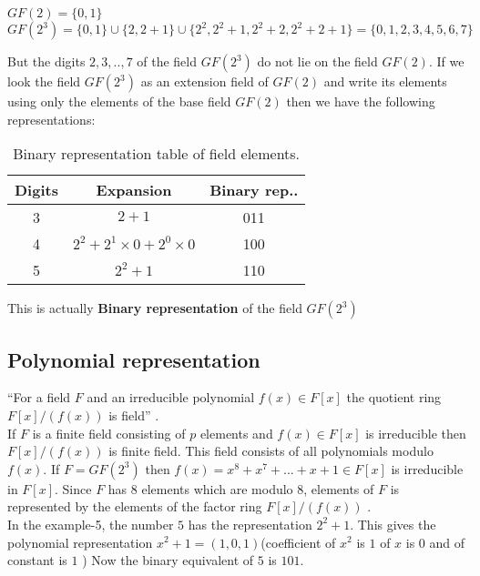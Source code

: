 \begin{example}
    \(GF(2)=\{0,1\}\)\\
    \(GF(2^3)=\{0,1\} \cup \{2,2+1\} \cup \{2^2,2^2+1,2^2+2,2^2+2+1\}=\{0,1,2,3,4,5,6,7\}\)
\end{example}

But the digits \(2,3,..,7\) of the field \(GF(2^3)\) do not lie on the field \(GF(2)\). If we look the field \(GF(2^3)\) as an extension field of \(GF(2)\) and write its elements using only the elements of the base field \(GF(2)\) then we have the following representations:
\vspace{3mm}

\begin{table}[h!]
  \centering
\begin{tabular}{|c|c|c|}
    \hline
    Digits & Expansion & Binary rep..\\
    \hline
    3 & \(2+1\) & 011 \\
    4 & \(2^2+2^1 \times 0 +2^0 \times 0\) & 100 \\
    5 & \(2^2+1\) & 110 \\
    \hline
\end{tabular}
\caption{\small Binary representation table of field elements.}
\end{table}
\vspace{3mm}

This is actually \textbf{Binary representation} of the field \(GF(2^3)\)



\subsection{Polynomial representation}
``For a field \(F\) and an irreducible polynomial \(f(x) \in F[x]\) the quotient ring \(F[x]/(f(x))\) is field'' \cite{galois}.\\
If \(F\) is a finite field consisting of \(p\) elements and \(f(x) \in F[x]\) is irreducible then \(F[x]/(f(x))\) is finite field. This field consists of all polynomials modulo \(f(x)\). If \(F=GF(2^3)\) then \(f(x)= x^8+x^7+...+x+1 \in F[x]\) is irreducible in \(F[x]\). Since \(F\) has \(8\) elements which are modulo \(8\), elements of \(F\) is represented by the elements of the factor ring \(F[x]/(f(x))\) \cite{aes}. \\


In the example-5, the number \(5\) has the representation \(2^2+1\). This gives the polynomial representation \(x^2+1=(1,0,1)\)(coefficient of \(x^2\) is \(1\) of \(x\) is \(0\) and of constant is \(1\) ) Now the binary equivalent of \(5\) is \(101\).

